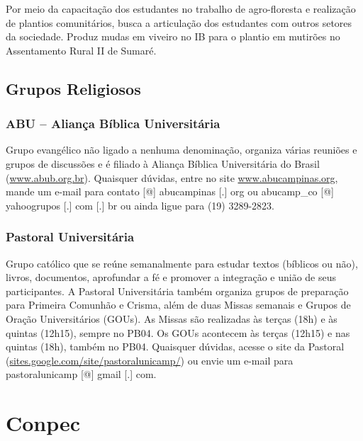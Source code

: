 Por meio da capacitação dos estudantes no trabalho de agro-floresta e realização
de plantios comunitários, busca a articulação dos estudantes com outros setores
da sociedade. Produz mudas em viveiro no IB para o plantio em mutirões no
Assentamento Rural II de Sumaré.

\subsection{Grupos Religiosos}

\subsubsection{ABU -- Aliança Bíblica Universitária}

Grupo evangélico não ligado a nenhuma denominação, organiza várias reuniões
e grupos de discussões e é filiado à Aliança Bíblica Universitária do Brasil
(\url{www.abub.org.br}). Quaisquer dúvidas, entre no site
\url{www.abucampinas.org}, mande um e-mail para contato [@] abucampinas
[.] org ou abucamp\_co [@] yahoogrupos [.] com [.] br ou ainda ligue para (19)
3289-2823.

\subsubsection{Pastoral Universitária}

Grupo católico que se reúne semanalmente para estudar textos (bíblicos ou não),
livros, documentos, aprofundar a fé e promover a integração e união de seus
participantes. A Pastoral Universitária também organiza grupos de preparação
para Primeira Comunhão e Crisma, além de duas Missas semanais e Grupos de Oração
Universitários (GOUs). As Missas são realizadas às terças (18h) e às
quintas (12h15), sempre no PB04. Os GOUs acontecem às terças (12h15) e
nas quintas (18h), também no PB04. Quaisquer dúvidas, acesse o site da
Pastoral (\url{sites.google.com/site/pastoralunicamp/}) ou
envie um e-mail para pastoralunicamp [@] gmail [.] com.

\section{Conpec}

